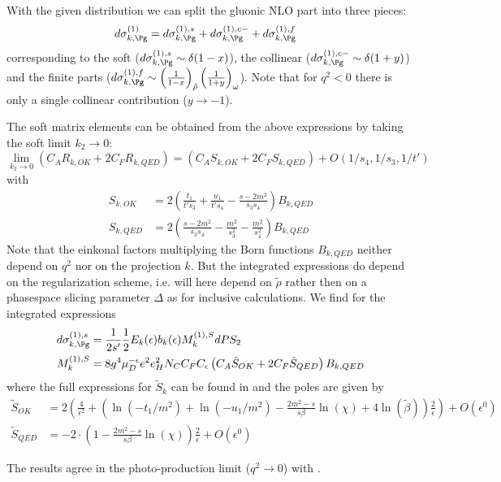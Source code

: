 With the given distribution we can split the gluonic NLO part into three pieces\cite{Harris:1995tu}:
\begin{align}
d\sigma_{k,\Pg}^{(1)} &= d\sigma_{k,\Pg}^{(1),s} + d\sigma_{k,\Pg}^{(1),c-} + d\sigma_{k,\Pg}^{(1),f}
\end{align}
corresponding to the soft ($d\sigma_{k,\Pg}^{(1),s} \sim \delta(1-x)$), the collinear ($d\sigma_{k,\Pg}^{(1),c-} \sim \delta(1+y)$) and the finite parts ($d\sigma_{k,\Pg}^{(1),f} \sim \left(\frac 1 {1-x}\right)_{\tilde \rho}\left(\frac 1 {1+y}\right)_{\omega}$). Note that for $q^2 < 0$ there is only a single collinear contribution ($y\rightarrow -1$).

The soft matrix elements can be obtained from the above expressions by taking the soft limit $k_2\rightarrow 0$:
\begin{equation}
\lim_{k_2\rightarrow 0}\left(C_A R_{k,OK} + 2C_F R_{k,QED}\right) = \left(C_A S_{k,OK} + 2C_F S_{k,QED}\right) + O(1/s_4,1/s_3,1/t')
\end{equation}
with
\begin{align}
S_{k,OK}  &= 2\left(\frac{t_1}{t's_3} + \frac{u_1}{t's_4}-\frac{s-2m^2}{s_3s_4}\right)B_{k,QED}\\
S_{k,QED} &= 2\left(\frac{s-2m^2}{s_3s_4} - \frac{m^2}{s_3^2} - \frac{m^2}{s_4^2}\right)B_{k,QED}
\end{align}
Note that the einkonal factors multiplying the Born functions $B_{k,QED}$ neither depend on $q^2$ nor on the projection $k$. But the integrated expressions do depend on the regularization scheme, i.e. will here depend on $\tilde\rho$ rather then on a phasespace slicing parameter $\Delta$ as for inclusive calculations\cite{Laenen1993162}. We find for the integrated expressions
\begin{align}
d\sigma_{k,\Pg}^{(1),s} &= \frac 1 {2s'}\frac 1 2 E_k(\epsilon) b_k(\epsilon) M_k^{(1),S} dPS_2\\
M_k^{(1),S} &= 8g^4\mu_D^{-\epsilon}e^2e_H^2 N_C C_F C_\epsilon\left( C_A \tilde S_{OK} + 2C_F \tilde S_{QED}\right) B_{k,QED}
\end{align}
where the full expressions for $\tilde S_k$ can be found in \cite{Harris:1995tu} and the poles are given by
\begin{align}
\tilde S_{OK} &= 2\left(\frac 4 {\epsilon^2} + \left(\ln(-t_1/m^2) + \ln(-u_1/m^2) - \frac{2m^2-s}{s\beta}\ln(\chi) + 4\ln(\tilde\beta)\right)\frac 2 {\epsilon}\right) + O(\epsilon^0)\\
\tilde S_{QED} &=-2\cdot \left(1 - \frac{2m^2-s}{s\beta}\ln(\chi)\right)\frac 2 \epsilon + O(\epsilon^0)
\end{align}

The results agree in the photo-production limit ($q^2\rightarrow 0$) with \cite{Bojak:1998zm}.
